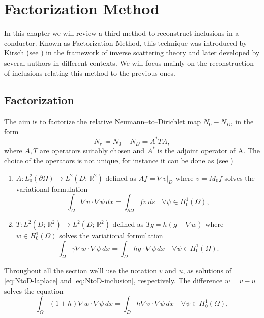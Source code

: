 \documentclass[10pt, a4paper, twoside, openright]{book}
\theoremstyle{definition}
\theoremstyle{plain}
\theoremstyle{plain}
\theoremstyle{plain}
\theoremstyle{plain}
\theoremstyle{plain}
\theoremstyle{plain}
\theoremstyle{plain}
\theoremstyle{plain}
\begin{document}
\chapter{Factorization Method}
\label{ch:factorization}
In this chapter we will review a third method to reconstruct inclusions in a conductor. Known as Factorization Method, 
this technique was introduced by Kirsch (see \cite{kirsch:factorization}) in the framework of inverse scattering theory and later developed by 
several authors in different contexts. We will focus mainly on the reconstruction of inclusions relating this method to 
the previous ones.
\section{Factorization}
The aim is to factorize the relative Neumann--to--Dirichlet map ${N_0} - {N_D}$, in the form
\begin{equation}
 {N_r}\coloneqq{N_0} - {N_D} = A^*TA,
\end{equation}
where $A,T$ are operators suitably chosen and $A^*$ is the adjoint operator of A. 
The choice of the operators is not unique, for instance it can be done as (see \cite{kirsch:book})
\begin{enumerate}
 \item $A:L^2_0(\partial \Omega) \to L^2(D;\,\mathbb{R}^2)$ defined as $Af = \nabla v|_D$ where $v = M_0f$ solves the variational formulation
 \begin{equation}
  \label{eq:def-A}
  \int_\Omega \nabla v\cdot \nabla \psi \, dx = \int_{\partial \Omega} fv\, ds\quad \forall\psi\in H^1_0(\Omega),
 \end{equation}
 \item $T:L^2(D;\,\mathbb{R}^2) \to L^2(D;\,\mathbb{R}^2)$ defined as $Tg = h(g - \nabla w)$ where $w\in H^1_0(\Omega)$ solves the variational formulation
 \begin{equation}
  \label{eq:def-T}
  \int_\Omega \gamma \nabla w\cdot \nabla \psi \, dx = \int_D hg\cdot\nabla\psi\, dx\quad \forall\psi\in H^1_0(\Omega).
 \end{equation}
\end{enumerate}
Throughout all the section we'll use the notation $v$ and $u$, as solutions of \eqref{eq:NtoD-laplace} and \eqref{eq:NtoD-inclusion}, respectively.
The difference $w = v - u$ solves the equation
\begin{equation}
 \int_\Omega(1+h)\nabla w\cdot\nabla\psi\, dx = \int_D h\nabla v \cdot \nabla \psi\, dx\quad \forall\psi\in H^1_0(\Omega),
\end{equation}
\end{document}

